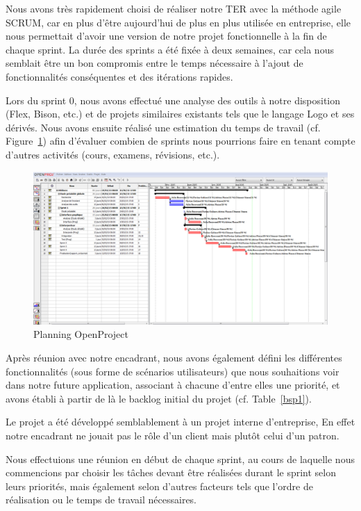Nous avons très rapidement choisi de réaliser notre TER avec la méthode agile SCRUM, car en plus d'être aujourd'hui de plus en plus utilisée en entreprise, elle nous permettait d'avoir une version de notre projet fonctionnelle à la fin de chaque sprint.
La durée des sprints a été fixée à deux semaines, car cela nous semblait être un bon compromis entre le temps nécessaire à l'ajout de fonctionnalités conséquentes et des itérations rapides.

Lors du sprint 0, nous avons effectué une analyse des outils à notre disposition (Flex, Bison, etc.) et de projets similaires existants tels que le langage Logo et ses dérivés. Nous avons ensuite réalisé une estimation du temps de travail (cf. Figure~\ref{planning}) afin d'évaluer combien de sprints nous pourrions faire en tenant compte d'autres activités (cours, examens, révisions, etc.).
\begin{figure}[h]
\includegraphics[scale=0.35]{doc/gestionProjet/planning.PNG}
\caption{\label{planning} Planning OpenProject}
\end{figure}

Après réunion avec notre encadrant, nous avons également défini les différentes fonctionnalités (sous forme de scénarios utilisateurs) que nous souhaitions voir dans notre future application, associant à chacune d'entre elles une priorité, et avons établi à partir de là le backlog initial du projet (cf. Table~\ref{bsp1}).

Le projet a été développé semblablement à un projet interne d'entreprise, En effet notre encadrant ne jouait pas le rôle d'un client mais plutôt celui d'un patron.

Nous effectuions une réunion en début de chaque sprint, au cours de laquelle nous commencions par choisir les tâches devant être réalisées durant le sprint selon leurs priorités, mais également selon d'autres facteurs tels que l'ordre de réalisation ou le temps de travail nécessaires.


